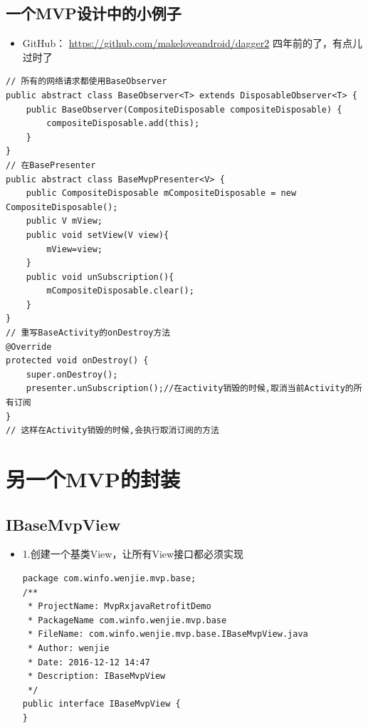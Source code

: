 \documentclass[9pt, b5paper]{article}
\begin{document}
\subsection{一个MVP设计中的小例子}
\label{sec-20-6}
\begin{itemize}
\item GitHub： \url{https://github.com/makeloveandroid/dagger2} 四年前的了，有点儿过时了
\end{itemize}
\begin{verbatim}
// 所有的网络请求都使用BaseObserver
public abstract class BaseObserver<T> extends DisposableObserver<T> {
    public BaseObserver(CompositeDisposable compositeDisposable) {
        compositeDisposable.add(this);
    }
}
// 在BasePresenter
public abstract class BaseMvpPresenter<V> {
    public CompositeDisposable mCompositeDisposable = new CompositeDisposable();
    public V mView;
    public void setView(V view){
        mView=view;
    }
    public void unSubscription(){
        mCompositeDisposable.clear();
    }
}
// 重写BaseActivity的onDestroy方法
@Override
protected void onDestroy() {
    super.onDestroy();
    presenter.unSubscription();//在activity销毁的时候,取消当前Activity的所有订阅
}
// 这样在Activity销毁的时候,会执行取消订阅的方法
\end{verbatim}

\section{另一个MVP的封装}
\label{sec-21}
\subsection{IBaseMvpView}
\label{sec-21-1}
\begin{itemize}
\item 1.创建一个基类View，让所有View接口都必须实现
\begin{verbatim}
package com.winfo.wenjie.mvp.base;
/**
 * ProjectName: MvpRxjavaRetrofitDemo
 * PackageName com.winfo.wenjie.mvp.base
 * FileName: com.winfo.wenjie.mvp.base.IBaseMvpView.java
 * Author: wenjie
 * Date: 2016-12-12 14:47
 * Description: IBaseMvpView
 */
public interface IBaseMvpView {
}
\end{verbatim}
\end{itemize}
\end{document}
